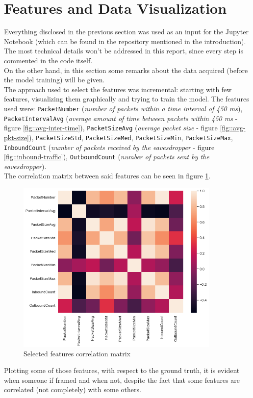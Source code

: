 \documentclass{article}
\begin{document}
\section{Features and Data Visualization}

Everything disclosed in the previous section was used as an input for the Jupyter Notebook (which can be found in the repository mentioned in the introduction). The most technical details won't be addressed in this report, since every step is commented in the code itself. \\ On the other hand, in this section some remarks about the data acquired (before the model training) will be given. \\ The approach used to select the features was incremental: starting with few features, visualizing them graphically and trying to train the model. The features used were: \texttt{PacketNumber} (\textit{number of packets within a time interval of 450 ms}), \texttt{PacketIntervalAvg} (\textit{average amount of time between packets within 450 ms} - figure \ref{fig::avg-inter-time}), \texttt{PacketSizeAvg} (\textit{average packet size} - figure \ref{fig::avg-pkt-size}), \texttt{PacketSizeStd}, \texttt{PacketSizeMed}, \texttt{PacketSizeMin}, \texttt{PacketSizeMax}, \texttt{InboundCount} (\textit{number of packets received by the eavesdropper} - figure \ref{fig::inbound-traffic}), \texttt{OutboundCount} (\textit{number of packets sent by the eavesdropper}). \\ The correlation matrix between said features can be seen in figure \ref{fig::correlation-matrix}.

\begin{figure}[h!]
	\centering
	\includegraphics[width=10cm]{assets/correlation.png}
	\caption{Selected features correlation matrix}
	\label{fig::correlation-matrix}
\end{figure}
Plotting some of those features, with respect to the ground truth, it is evident when someone if framed and when not, despite the fact that some features are correlated (not completely) with some others.
\end{document}
